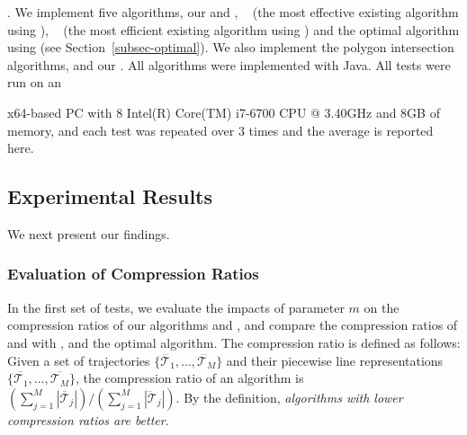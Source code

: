 .
We implement five \lsa algorithms, \ie our \cist and \cista, \dps~\cite{Meratnia:Spatiotemporal} (the most effective existing \lsa algorithm using \sed), \squishe~\cite{Muckell:Compression} (the most efficient existing \lsa algorithm using \sed) and the optimal \lsa algorithm using \sed (see Section~\ref{subsec-optimal}).
We also implement the polygon intersection algorithms, \cpia and our \rpia.
All algorithms were implemented with Java.
All tests were run on an {x64-based  PC with 8 Intel(R) Core(TM) i7-6700 CPU @ 3.40GHz and 8GB of memory, and each test was repeated
over 3 times and the average is reported here.

%

\subsection{Experimental Results}

We next present our findings.

\subsubsection{Evaluation of Compression Ratios}


In the first set of tests, we evaluate the impacts of parameter $m$ on the
compression ratios of our algorithms \cist and \cista, and compare the compression ratios of \cist and \cista with \dps, \squishe and the optimal algorithm.
%
The compression ratio is defined as follows: Given a set of trajectories $\{\dddot{\mathcal{T}_1}, \ldots, \dddot{\mathcal{T}_M}\}$ and their piecewise line representations $\{\overline{\mathcal{T}_1}, \ldots, \overline{\mathcal{T}_M}\}$, the compression ratio of an algorithm is $(\sum_{j=1}^{M} |\overline{\mathcal{T}}_j |)/(\sum_{j=1}^{M} |\dddot{\mathcal{T}}_j |)$.
By the definition, \emph{algorithms with lower compression ratios are better}.





}
